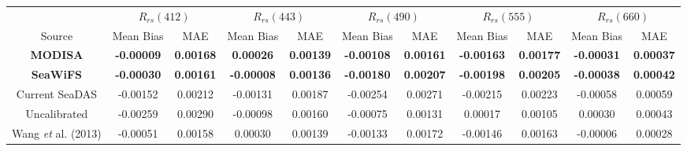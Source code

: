 \documentclass[preview]{standalone}
\begin{document}
\centering
\begin{tabular}{@{\extracolsep{4pt}}ccccccccccc@{}} 
 \hline
 							& \multicolumn{2}{c}{$R_{rs}(412)$} & \multicolumn{2}{c}{$R_{rs}(443)$} & \multicolumn{2}{c}{$R_{rs}(490)$} & \multicolumn{2}{c}{$R_{rs}(555)$} & \multicolumn{2}{c}{$R_{rs}(660)$}\\ \cline{2-3} \cline{4-5} \cline{6-7} \cline{8-9} \cline{10-11}
 Source 					& Mean Bias			& MAE 			& Mean Bias			& MAE 			& Mean Bias 		& MAE 			& Mean Bias 		& MAE 			& Mean Bias 		& MAE 			\\ \cline{1-1}\cline{2-3} \cline{4-5} \cline{6-7} \cline{8-9} \cline{10-11} 
{\bf MODISA} 				& {\bf -0.00009} 	& {\bf 0.00168} & {\bf  0.00026} 	& {\bf 0.00139} & {\bf -0.00108} 	& {\bf 0.00161} & {\bf -0.00163} 	& {\bf 0.00177} & {\bf -0.00031} & {\bf 0.00037}	\\
{\bf SeaWiFS} 				& {\bf -0.00030} 	& {\bf 0.00161} & {\bf -0.00008} 	& {\bf 0.00136} & {\bf -0.00180} 	& {\bf 0.00207} & {\bf -0.00198} 	& {\bf 0.00205} & {\bf -0.00038} & {\bf 0.00042} 	\\ 
Current SeaDAS 				& -0.00152 			& 0.00212  		& -0.00131 			& 0.00187  		& -0.00254 			& 0.00271  		& -0.00215 			& 0.00223  		& -0.00058 		 & 0.00059 			\\
Uncalibrated 				& -0.00259 			& 0.00290		& -0.00098 			& 0.00160		& -0.00075 			& 0.00131		&  0.00017 			& 0.00105		&  0.00030 		 & 0.00043 			\\
Wang {\it et} al. (2013) 	& -0.00051 			& 0.00158 		&  0.00030 			& 0.00139 		& -0.00133 			& 0.00172 		& -0.00146 			& 0.00163 		& -0.00006 		 & 0.00028 			\\ \hline


\end{tabular}
\end{document}
